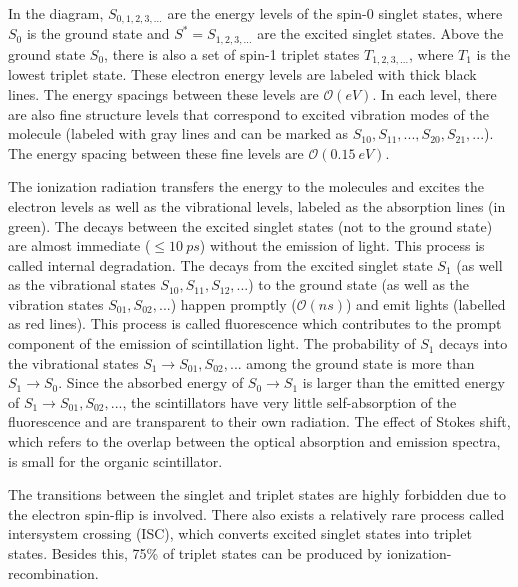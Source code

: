 In the diagram, $S_{0,1,2,3,...}$ are the energy levels of the spin-0 singlet states, where $S_0$ is the ground state and $S^*=S_{1,2,3,...}$ are the excited singlet states. Above the ground state $S_0$, there is also a set of spin-1 triplet states $T_{1,2,3,...}$, where $T_1$ is the lowest triplet state. These electron energy levels are labeled with thick black lines. The energy spacings between these levels are $\mathcal{O}(eV)$. In each level, there are also fine structure levels that correspond to excited vibration modes of the molecule (labeled with gray lines and can be marked as $S_{10}, S_{11}, ..., S_{20}, S_{21}, ...$). The energy spacing between these fine levels are $\mathcal{O}(0.15~eV)$\cite{leo2012techniques, knoll2010radiation}.

The ionization radiation transfers the energy to the molecules and excites the electron levels as well as the vibrational levels, labeled as the absorption lines (in green). The decays between the excited singlet states (not to the ground state) are almost immediate ($\leq 10~ps$) without the emission of light. This process is called internal degradation. The decays from the excited singlet state $S_1$ (as well as the vibrational states $S_{10},S_{11},S_{12},...$) to the ground state (as well as the vibration states $S_{01}, S_{02}, ...$) happen promptly ($\mathcal{O}(ns)$) and emit lights (labelled as red lines). This process is called fluorescence which contributes to the prompt component of the emission of scintillation light. The probability of $S_1$ decays into the vibrational states $S_1 \to S_{01},S_{02},...$ among the ground state is more than $S_1\to S_0$. Since the absorbed energy of $S_0 \to S_1$ is larger than the emitted energy of $S_1 \to S_{01}, S_{02},...$, the scintillators have very little self-absorption of the fluorescence and are transparent to their own radiation. The effect of Stokes shift, which refers to the overlap between the optical absorption and emission spectra, is small for the organic scintillator\cite{leo2012techniques,knoll2010radiation}. 

The transitions between the singlet and triplet states are highly forbidden due to the
electron spin-flip is involved\cite{von2015measurement,sorensen2016temperature}. There also exists a relatively rare process called intersystem crossing (ISC), which converts excited singlet states into triplet states. Besides this, 75\% of triplet states can be produced by ionization-recombination\cite{von2015measurement,dunger2018topological}.

